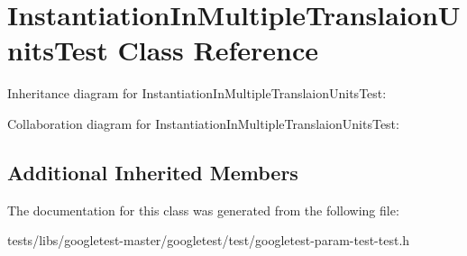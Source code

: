\hypertarget{classInstantiationInMultipleTranslaionUnitsTest}{}\section{Instantiation\+In\+Multiple\+Translaion\+Units\+Test Class Reference}
\label{classInstantiationInMultipleTranslaionUnitsTest}


Inheritance diagram for Instantiation\+In\+Multiple\+Translaion\+Units\+Test\+:


Collaboration diagram for Instantiation\+In\+Multiple\+Translaion\+Units\+Test\+:
\subsection*{Additional Inherited Members}


The documentation for this class was generated from the following file\+:\begin{DoxyCompactItemize}
\item 
tests/libs/googletest-\/master/googletest/test/googletest-\/param-\/test-\/test.\+h\end{DoxyCompactItemize}
